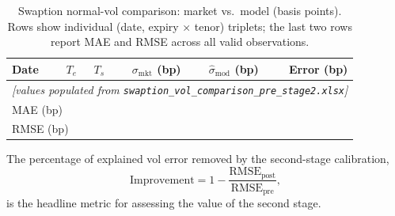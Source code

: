 \begin{table}[H]
\centering
\caption{Swaption normal-vol comparison: market vs.\ model (basis points). Rows show
individual (date, expiry × tenor) triplets; the last two rows report MAE and RMSE across
all valid observations.}
\label{tab:vol_comparison}
\begin{tabular}{@{}lrrrrr@{}}
\toprule
Date & $T_e$ & $T_s$ & $\sigma_\mathrm{mkt}$ (bp) & $\hat\sigma_\mathrm{mod}$ (bp) & Error (bp) \\
\midrule
\multicolumn{6}{c}{\textit{[values populated from \texttt{swaption\_vol\_comparison\_pre\_stage2.xlsx}]}} \\
\midrule
\multicolumn{5}{l}{MAE (bp)} & \\
\multicolumn{5}{l}{RMSE (bp)} & \\
\bottomrule
\end{tabular}
\end{table}

\noindent
The percentage of explained vol error removed by the second-stage calibration,
\[
    \text{Improvement} = 1 - \frac{\mathrm{RMSE}_{\mathrm{post}}}{\mathrm{RMSE}_{\mathrm{pre}}},
\]
is the headline metric for assessing the value of the second stage.
